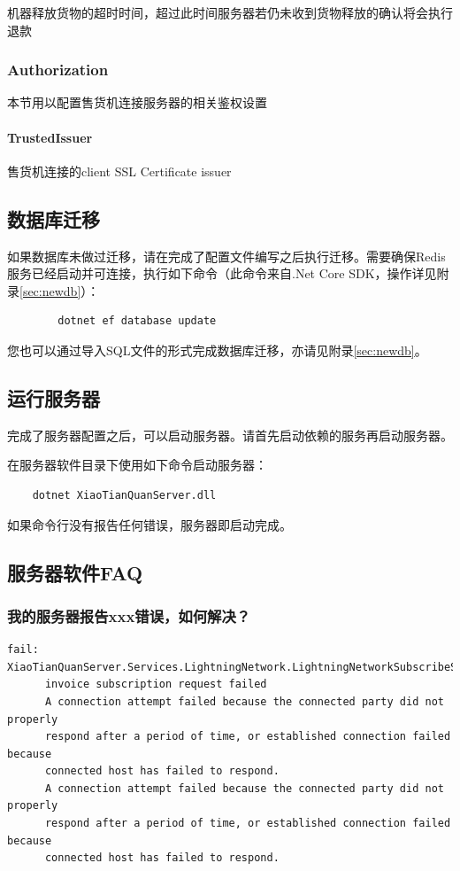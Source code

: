 \documentclass[a4paper,11pt]{article}
\theoremstyle{definition}
\begin{document}
机器释放货物的超时时间，超过此时间服务器若仍未收到货物释放的确认将会执行退款

\subsubsection{Authorization}
本节用以配置售货机连接服务器的相关鉴权设置

\paragraph{TrustedIssuer}


售货机连接的client SSL Certificate issuer

\subsection{数据库迁移}

如果数据库未做过迁移，请在完成了配置文件编写之后执行迁移。需要确保Redis服务已经启动并可连接，执行如下命令（此命令来自.Net Core SDK，操作详见附录\ref{sec:newdb}）：
    \begin{verbatim}
        dotnet ef database update
    \end{verbatim}

您也可以通过导入SQL文件的形式完成数据库迁移，亦请见附录\ref{sec:newdb}。

\subsection{运行服务器}

完成了服务器配置之后，可以启动服务器。请首先启动依赖的服务再启动服务器。

在服务器软件目录下使用如下命令启动服务器：

    \begin{verbatim}
    dotnet XiaoTianQuanServer.dll
    \end{verbatim}
    
如果命令行没有报告任何错误，服务器即启动完成。

\subsection{服务器软件FAQ}

\subsubsection{我的服务器报告xxx错误，如何解决？}

\begin{verbatim}
fail: XiaoTianQuanServer.Services.LightningNetwork.LightningNetworkSubscribeService[0]
      invoice subscription request failed 
      A connection attempt failed because the connected party did not properly 
      respond after a period of time, or established connection failed because 
      connected host has failed to respond.
      A connection attempt failed because the connected party did not properly 
      respond after a period of time, or established connection failed because 
      connected host has failed to respond.
\end{verbatim}
\end{document}
